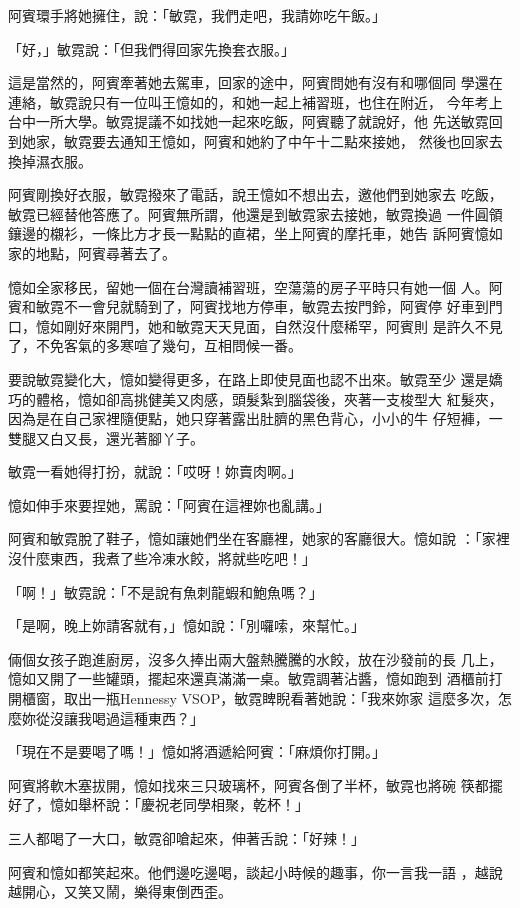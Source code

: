 阿賓環手將她擁住，說：「敏霓，我們走吧，我請妳吃午飯。」

「好，」敏霓說：「但我們得回家先換套衣服。」

這是當然的，阿賓牽著她去駕車，回家的途中，阿賓問她有沒有和哪個同
學還在連絡，敏霓說只有一位叫王憶如的，和她一起上補習班，也住在附近，
今年考上台中一所大學。敏霓提議不如找她一起來吃飯，阿賓聽了就說好，他
先送敏霓回到她家，敏霓要去通知王憶如，阿賓和她約了中午十二點來接她，
然後也回家去換掉濕衣服。

阿賓剛換好衣服，敏霓撥來了電話，說王憶如不想出去，邀他們到她家去
吃飯，敏霓已經替他答應了。阿賓無所謂，他還是到敏霓家去接她，敏霓換過
一件圓領鑲邊的櫬衫，一條比方才長一點點的直裙，坐上阿賓的摩托車，她告
訴阿賓憶如家的地點，阿賓尋著去了。

憶如全家移民，留她一個在台灣讀補習班，空蕩蕩的房子平時只有她一個
人。阿賓和敏霓不一會兒就騎到了，阿賓找地方停車，敏霓去按門鈴，阿賓停
好車到門口，憶如剛好來開門，她和敏霓天天見面，自然沒什麼稀罕，阿賓則
是許久不見了，不免客氣的多寒喧了幾句，互相問候一番。

要說敏霓變化大，憶如變得更多，在路上即使見面也認不出來。敏霓至少
還是嬌巧的體格，憶如卻高挑健美又肉感，頭髮紮到腦袋後，夾著一支梭型大
紅髮夾，因為是在自己家裡隨便點，她只穿著露出肚臍的黑色背心，小小的牛
仔短褲，一雙腿又白又長，還光著腳丫子。

敏霓一看她得打扮，就說：「哎呀！妳賣肉啊。」

憶如伸手來要捏她，罵說：「阿賓在這裡妳也亂講。」

阿賓和敏霓脫了鞋子，憶如讓她們坐在客廳裡，她家的客廳很大。憶如說
：「家裡沒什麼東西，我煮了些冷凍水餃，將就些吃吧！」

「啊！」敏霓說：「不是說有魚刺龍蝦和鮑魚嗎？」

「是啊，晚上妳請客就有，」憶如說：「別囉嗦，來幫忙。」

倆個女孩子跑進廚房，沒多久捧出兩大盤熱騰騰的水餃，放在沙發前的長
几上，憶如又開了一些罐頭，擺起來還真滿滿一桌。敏霓調著沾醬，憶如跑到
酒櫃前打開櫃窗，取出一瓶Hennessy VSOP，敏霓睥睨看著她說：「我來妳家
這麼多次，怎麼妳從沒讓我喝過這種東西？」

「現在不是要喝了嗎！」憶如將酒遞給阿賓：「麻煩你打開。」

阿賓將軟木塞拔開，憶如找來三只玻璃杯，阿賓各倒了半杯，敏霓也將碗
筷都擺好了，憶如舉杯說：「慶祝老同學相聚，乾杯！」

三人都喝了一大口，敏霓卻嗆起來，伸著舌說：「好辣！」

阿賓和憶如都笑起來。他們邊吃邊喝，談起小時候的趣事，你一言我一語
，越說越開心，又笑又鬧，樂得東倒西歪。


